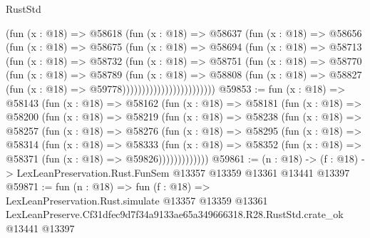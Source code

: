 \begin{lexlean}{RustStd}
\begin{coremodule}
                          (fun (x : @18) =>
                          @58618
                            (fun (x : @18) =>
                            @58637
                              (fun (x : @18) =>
                              @58656
                                (fun (x : @18) =>
                                @58675
                                  (fun (x : @18) =>
                                  @58694
                                    (fun (x : @18) =>
                                    @58713
                                      (fun (x : @18) =>
                                      @58732
                                        (fun (x : @18) =>
                                        @58751
                                          (fun (x : @18) =>
                                          @58770
                                            (fun (x : @18) =>
                                            @58789
                                              (fun (x : @18) =>
                                              @58808
                                                (fun (x : @18) =>
                                                @58827
                                                  (fun (x : @18) => @59778))))))))))))))))))))))))
@59853 := fun (x : @18) =>
  @58143
    (fun (x : @18) =>
    @58162
      (fun (x : @18) =>
      @58181
        (fun (x : @18) =>
        @58200
          (fun (x : @18) =>
          @58219
            (fun (x : @18) =>
            @58238
              (fun (x : @18) =>
              @58257
                (fun (x : @18) =>
                @58276
                  (fun (x : @18) =>
                  @58295
                    (fun (x : @18) =>
                    @58314
                      (fun (x : @18) =>
                      @58333
                        (fun (x : @18) =>
                        @58352 (fun (x : @18) => @58371 (fun (x : @18) => @59826)))))))))))))
@59861 := (n : @18) ->
  (f : @18) -> LexLeanPreservation.Rust.FunSem @13357 @13359 @13361 @13441 @13397
@59871 := fun (n : @18) =>
  fun (f : @18) =>
  LexLeanPreservation.Rust.simulate
    @13357
    @13359
    @13361
    LexLeanPreserve.Cf31dfec9d7f34a9133ae65a349666318.R28.RustStd.crate_ok
    @13441
    @13397
\end{coremodule}
\end{lexlean}

